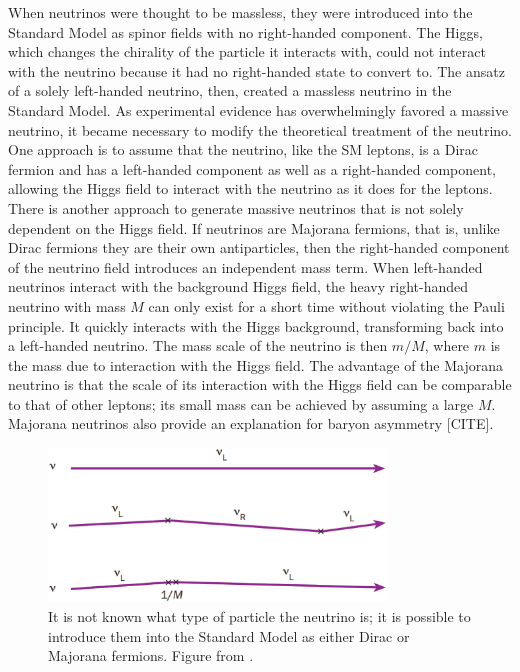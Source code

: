 When neutrinos were thought to be massless, they were introduced into the Standard Model as spinor fields with no right-handed component.  The Higgs, which changes the chirality of the particle it interacts with, could not interact with the neutrino because it had no right-handed state to convert to.  The ansatz of a solely left-handed neutrino, then, created a massless neutrino in the Standard Model.  As experimental evidence has overwhelmingly favored a massive neutrino, it became necessary to modify the theoretical treatment of the neutrino.  One approach is to assume that the neutrino, like the SM leptons, is a Dirac fermion and has a left-handed component as well as a right-handed component, allowing the Higgs field to interact with the neutrino as it does for the leptons.  There is another approach to generate massive neutrinos that is not solely dependent on the Higgs field.  If neutrinos are Majorana fermions, that is, unlike Dirac fermions they are their own antiparticles, then the right-handed component of the neutrino field introduces an independent mass term.  When left-handed neutrinos interact with the background Higgs field, the heavy right-handed neutrino with mass $M$ can only exist for a short time without violating the Pauli principle.  It quickly interacts with the Higgs background, transforming back into a left-handed neutrino.  The mass scale of the neutrino is then $m/M$, where $m$ is the mass due to interaction with the Higgs field.  The advantage of the Majorana neutrino is that the scale of its interaction with the Higgs field can be comparable to that of other leptons; its small mass can be achieved by assuming a large $M$.  Majorana neutrinos also provide an explanation for baryon asymmetry [CITE].  
\begin{figure}[htp]
\centering
\includegraphics[width=0.8\textwidth]{figures/neutrinoMass.eps}
\caption{It is not known what type of particle the neutrino is; it is possible to introduce them into the Standard Model as either Dirac or Majorana fermions.  Figure from \cite{neutrinoMass}.}
\label{fig:leptonMass}
\end{figure}  

